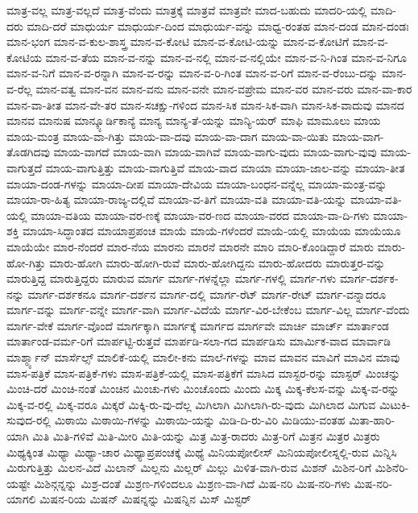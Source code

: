 {ಮಾತ್ರ-ವಲ್ಲ
ಮಾತ್ರ-ವಲ್ಲದೆ
ಮಾತ್ರ-ವೆಂದು
ಮಾತ್ರಕ್ಕೆ
ಮಾತ್ರವೆ
ಮಾತ್ರವೇ
ಮಾದ-ಬಹುದು
ಮಾದರಿ-ಯಲ್ಲಿ
ಮಾದಿ-ದರು
ಮಾದಿ-ದರೆ
ಮಾಧುರ್ಯ
ಮಾಧುರ್ಯ-ದಿಂದ
ಮಾಧುರ್ಯ-ವನ್ನು
ಮಾಧ್ವ-ರಂತಹ
ಮಾನ-ದಂಡ
ಮಾನ-ದಂಡಃ
ಮಾನ-ಭಂಗ
ಮಾನ-ವ-ಕುಲ-ಶಾಸ್ತ್ರ
ಮಾನ-ವ-ಕೋಟಿ
ಮಾನ-ವ-ಕೋಟಿ-ಯನ್ನು
ಮಾನ-ವ-ಕೋಟಿಗೆ
ಮಾನ-ವ-ಕೋಟಿಯ
ಮಾನ-ವ-ತೆಯ
ಮಾನ-ವ-ನನ್ನು
ಮಾನ-ವ-ನಲ್ಲಿ
ಮಾನ-ವ-ನಲ್ಲಿಯೇ
ಮಾನ-ವ-ನಿ-ಗಿಂತ
ಮಾನ-ವ-ನಿಗೂ
ಮಾನ-ವ-ನಿಗೆ
ಮಾನ-ವ-ರನ್ನಾಗಿ
ಮಾನ-ವ-ರನ್ನು
ಮಾನ-ವ-ರಿ-ಗಿಂತ
ಮಾನ-ವ-ರಿಗೆ
ಮಾನ-ವ-ರೆಂಬು-ದನ್ನು
ಮಾನ-ವ-ರೆಲ್ಲ
ಮಾನ-ವತ್ವ
ಮಾನ-ವನ
ಮಾನ-ವನು
ಮಾನ-ವನೇ
ಮಾನ-ವಪ್ರೇಮ
ಮಾನ-ವರ
ಮಾನ-ವರು
ಮಾನ-ವಾ-ಕಾರ
ಮಾನ-ವಾ-ತೀತ
ಮಾನ-ವೇ-ತರ
ಮಾನ-ಸಚಕ್ಷು-ಗಳಿಂದ
ಮಾನ-ಸಿಕ
ಮಾನ-ಸಿಕ-ವಾಗಿ
ಮಾನ-ಸಿಕ-ವಾದುವು
ಮಾನದ
ಮಾನವ
ಮಾನುಷ
ಮಾನ್ಕ್ಯೂರ್ಡಿಕಾನ್ಯೆ
ಮಾನ್ಯ
ಮಾನ್ಯ-ತೆ-ಯನ್ನು
ಮಾನ್ಯಿ-ಯರ್
ಮಾಫಿ
ಮಾಮೂಲು
ಮಾಯ
ಮಾಯ-ಮಂತ್ರ
ಮಾಯ-ವಾ-ಗಿತ್ತು
ಮಾಯ-ವಾ-ದವು
ಮಾಯ-ವಾ-ದಾಗ
ಮಾಯ-ವಾ-ಯಿತು
ಮಾಯ-ವಾಗ-ತೊಡಗಿದವು
ಮಾಯ-ವಾಗದೆ
ಮಾಯ-ವಾಗಿ
ಮಾಯ-ವಾಗಿವೆ
ಮಾಯ-ವಾಗು-ವುದು
ಮಾಯ-ವಾಗು-ವುವು
ಮಾಯ-ವಾಗುತ್ತದೆ
ಮಾಯ-ವಾಗುತ್ತಿತ್ತು
ಮಾಯ-ವಾಗುತ್ತಿವೆ
ಮಾಯ-ವಾದ
ಮಾಯಾ
ಮಾಯಾ-ಜಾಲ-ವನ್ನು
ಮಾಯಾ-ತೀತ
ಮಾಯಾ-ದಂಡ-ಗಳನ್ನು
ಮಾಯಾ-ದೀಪ
ಮಾಯಾ-ದೇವಿಯ
ಮಾಯಾ-ಬಂಧನ-ವನ್ನೆಲ್ಲ
ಮಾಯಾ-ಮಂತ್ರ-ವನ್ನು
ಮಾಯಾ-ರಾ-ಹಿತ್ಯ
ಮಾಯಾ-ರಾಜ್ಯ-ದಲ್ಲಿವೆ
ಮಾಯಾ-ವ-ತಿಗೆ
ಮಾಯಾ-ವತಿ
ಮಾಯಾ-ವತಿ-ಯನ್ನು
ಮಾಯಾ-ವತಿ-ಯಲ್ಲಿ
ಮಾಯಾ-ವತಿಯ
ಮಾಯಾ-ವರ-ಣಕ್ಕೆ
ಮಾಯಾ-ವರ-ಣದ
ಮಾಯಾ-ವರದ
ಮಾಯಾ-ವಾ-ದಿ-ಗಳು
ಮಾಯಾ-ಶಕ್ತಿ
ಮಾಯಾ-ಸಿದ್ಧಾಂತದ
ಮಾಯಾಪ್ರಪಂಚ
ಮಾಯೆ
ಮಾಯೆ-ಗಳೆಂದರೆ
ಮಾಯೆ-ಯಲ್ಲಿ
ಮಾಯೆಯ
ಮಾಯೆಯೂ
ಮಾಯೆಯೇ
ಮಾರ-ನೆಂದರೆ
ಮಾರ-ನೆಯ
ಮಾರನು
ಮಾರನೆ
ಮಾರನೇ
ಮಾರಿ
ಮಾರಿ-ಕೊಂಡಿದ್ದಾರೆ
ಮಾರು
ಮಾರು-ಹೋ-ಗಿತ್ತು
ಮಾರು-ಹೋಗಿ
ಮಾರು-ಹೋಗಿ-ರುವೆ
ಮಾರು-ಹೋಗಿದ್ದನು
ಮಾರು-ಹೋದರು
ಮಾರುತ್ತರ-ವನ್ನು
ಮಾರುತ್ತಿದ್ದ
ಮಾರುತ್ತಿದ್ದರು
ಮಾರುವ
ಮಾರ್ಗ
ಮಾರ್ಗ-ಗಳನ್ನೆಲ್ಲಾ
ಮಾರ್ಗ-ಗಳಲ್ಲಿ
ಮಾರ್ಗ-ಗಳು
ಮಾರ್ಗ-ದರ್ಶಕ-ನನ್ನು
ಮಾರ್ಗ-ದರ್ಶಕನೂ
ಮಾರ್ಗ-ದರ್ಶನ
ಮಾರ್ಗ-ದಲ್ಲಿ
ಮಾರ್ಗ-ರೆಟ್
ಮಾರ್ಗ-ರೇಟ್
ಮಾರ್ಗ-ವನ್ನಾದರೂ
ಮಾರ್ಗ-ವನ್ನು
ಮಾರ್ಗ-ವನ್ನೇ
ಮಾರ್ಗ-ವಾಗಿ
ಮಾರ್ಗ-ವಿದೆಯೆ
ಮಾರ್ಗ-ವಿರ-ಬೇಕೆಂಬ
ಮಾರ್ಗ-ವಿಲ್ಲ
ಮಾರ್ಗ-ವೆಂದು
ಮಾರ್ಗ-ವೇಕೆ
ಮಾರ್ಗ-ವೊಂದೆ
ಮಾರ್ಗಕ್ಕಾಗಿ
ಮಾರ್ಗಕ್ಕೆ
ಮಾರ್ಗದ
ಮಾರ್ಗವೇ
ಮಾರ್ಚಿ
ಮಾರ್ಚ್
ಮಾರ್ತಾಂಡ
ಮಾರ್ತಾಂಡ-ವರ್ಮ-ರಿಗೆ
ಮಾರ್ಪಟ್ಟಿ-ರುತ್ತವೆ
ಮಾರ್ಪಡಿ-ಸಲಾ-ಗದ
ಮಾರ್ಪಡಿಸು
ಮಾರ್ಮಿಕ-ವಾದ
ಮಾರ್ವಾಡಿ
ಮಾರ್ಶ್ಮ್ಯಾನ್
ಮಾರ್ಸೆಲ್ಸ್
ಮಾಲಿಕೆ-ಯಲ್ಲಿ
ಮಾಲೀ-ಕನು
ಮಾಲೆ-ಗಳನ್ನು
ಮಾವ
ಮಾವನ
ಮಾವಿಗೆ
ಮಾವಿನ
ಮಾವು
ಮಾಸ-ಪತ್ರಿಕೆ
ಮಾಸ-ಪತ್ರಿಕೆ-ಗಳು
ಮಾಸ-ಪತ್ರಿಕೆ-ಯಲ್ಲಿ
ಮಾಸ-ಪತ್ರಿಕೆಗೆ
ಮಾಸಿದ
ಮಾಸ್ಟರ-ರನ್ನು
ಮಾಸ್ಟರ್
ಮಿಂಚನ್ನು
ಮಿಂಚಿ-ದರೆ
ಮಿಂಚಿ-ನಂತೆ
ಮಿಂಚಿನ
ಮಿಂಚು-ಗಳು
ಮಿಂಚೊಂದು
ಮಿಂದು
ಮಿಕ್ಕ
ಮಿಕ್ಕ-ಕೆಲಸ-ವನ್ನು
ಮಿಕ್ಕ-ವ-ರನ್ನು
ಮಿಕ್ಕ-ವ-ರಲ್ಲಿ
ಮಿಕ್ಕ-ವರೂ
ಮಿಕ್ಕರೆ
ಮಿಕ್ಕಿ-ರು-ವು-ದೆಲ್ಲ
ಮಿಗಿಲಾಗಿ
ಮಿಗಿಲಾಗಿ-ರು-ವುದು
ಮಿಗಿಲಾದ
ಮಿಗುವ
ಮಿಟುಕಿ-ಸುವುದ-ರಲ್ಲಿ
ಮಿಠಾಯಿ
ಮಿಠಾಯಿ-ಗಳನ್ನು
ಮಿಠಾಯಿ-ಯನ್ನು
ಮಿಡಿ-ದಿ-ರು-ವಿರಿ
ಮಿಡಿಯು-ವಂತಹ
ಮಿತಾ-ಹಾರಿ-ಯಾಗಿ
ಮಿತಿ
ಮಿತಿ-ಗಳಿವೆ
ಮಿತಿ-ಮೀರಿ
ಮಿತಿ-ಯನ್ನು
ಮಿತ್ರ
ಮಿತ್ರ-ರಾದರು
ಮಿತ್ರ-ರಿಗೆ
ಮಿತ್ರನ
ಮಿತ್ರರ
ಮಿತ್ರರು
ಮಿಥ್ಯಕ್ಕಿಂತ
ಮಿಥ್ಯಾ
ಮಿಥ್ಯಾ-ಚಾರ
ಮಿಥ್ಯಾಪ್ರಪಂಚಕ್ಕೆ
ಮಿಥ್ಯೆ
ಮಿನಿಯಪೋಲೀಸ್
ಮಿನಿಯಪೋಲೀಸ್ನಲ್ಲಿ-ರುವ
ಮಿನ್ನಿಸಿ
ಮಿರುಗುತ್ತಿತ್ತು
ಮಿಲನ-ವಿದೆ
ಮಿಲಾನ್
ಮಿಲ್ಲನು
ಮಿಲ್ಲರ್
ಮಿಲ್ಲು
ಮಿಳಿತ-ವಾಗಿ-ರುವ
ಮಿಶನ್
ಮಿಶಿನ-ರಿಗೆ
ಮಿಶಿನೆರಿ-ಯಷ್ಟೇ
ಮಿಶಿನ್ಗನ್ನನ್ನು
ಮಿಶ್ರ-ದಂತೆ
ಮಿಶ್ರಣ-ಗಳಿಂದಲೂ
ಮಿಶ್ರಣ-ವಾ-ಗಿದೆ
ಮಿಷ-ನರಿ
ಮಿಷ-ನರಿ-ಗಳು
ಮಿಷ-ನರಿ-ಯಾಗಲಿ
ಮಿಷನ-ರಿಯ
ಮಿಷನ್
ಮಿಷನ್ನನ್ನು
ಮಿಷನ್ನಿನ
ಮಿಸ್
ಮಿಸ್ಟರ್
}
